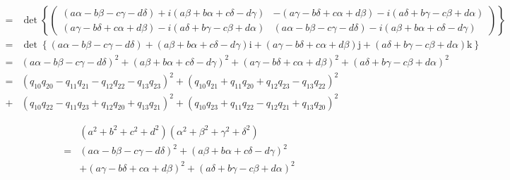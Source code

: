 \documentclass[
]{book}
\theoremstyle{definition}
\theoremstyle{definition}
\theoremstyle{definition}
\theoremstyle{definition}
\theoremstyle{remark}
\begin{document}
\[\begin{aligned}
= & \det\left\{ \begin{pmatrix}\left(a\alpha-b\beta-c\gamma-d\delta\right)+i\left(a\beta+b\alpha+c\delta-d\gamma\right) & -\left(a\gamma-b\delta+c\alpha+d\beta\right)-i\left(a\delta+b\gamma-c\beta+d\alpha\right)\\
\left(a\gamma-b\delta+c\alpha+d\beta\right)-i\left(a\delta+b\gamma-c\beta+d\alpha\right) & \left(a\alpha-b\beta-c\gamma-d\delta\right)-i\left(a\beta+b\alpha+c\delta-d\gamma\right)
\end{pmatrix}\right\} \\
= & \det\left\{ \left(a\alpha-b\beta-c\gamma-d\delta\right)+\left(a\beta+b\alpha+c\delta-d\gamma\right)\mathrm{i}+\left(a\gamma-b\delta+c\alpha+d\beta\right)\mathrm{j}+\left(a\delta+b\gamma-c\beta+d\alpha\right)\mathrm{k}\right\} \\
= & \left(a\alpha-b\beta-c\gamma-d\delta\right)^{2}+\left(a\beta+b\alpha+c\delta-d\gamma\right)^{2}+\left(a\gamma-b\delta+c\alpha+d\beta\right)^{2}+\left(a\delta+b\gamma-c\beta+d\alpha\right)^{2}\\
= & \left(q_{{\scriptscriptstyle 10}}q_{{\scriptscriptstyle 20}}-q_{{\scriptscriptstyle 11}}q_{{\scriptscriptstyle 21}}-q_{{\scriptscriptstyle 12}}q_{{\scriptscriptstyle 22}}-q_{{\scriptscriptstyle 13}}q_{{\scriptscriptstyle 23}}\right)^{2}+\left(q_{{\scriptscriptstyle 10}}q_{{\scriptscriptstyle 21}}+q_{{\scriptscriptstyle 11}}q_{{\scriptscriptstyle 20}}+q_{{\scriptscriptstyle 12}}q_{{\scriptscriptstyle 23}}-q_{{\scriptscriptstyle 13}}q_{{\scriptscriptstyle 22}}\right)^{2}\\
+ & \left(q_{{\scriptscriptstyle 10}}q_{{\scriptscriptstyle 22}}-q_{{\scriptscriptstyle 11}}q_{{\scriptscriptstyle 23}}+q_{{\scriptscriptstyle 12}}q_{{\scriptscriptstyle 20}}+q_{{\scriptscriptstyle 13}}q_{{\scriptscriptstyle 21}}\right)^{2}+\left(q_{{\scriptscriptstyle 10}}q_{{\scriptscriptstyle 23}}+q_{{\scriptscriptstyle 11}}q_{{\scriptscriptstyle 22}}-q_{{\scriptscriptstyle 12}}q_{{\scriptscriptstyle 21}}+q_{{\scriptscriptstyle 13}}q_{{\scriptscriptstyle 20}}\right)^{2}
\end{aligned}
\]

\[
\begin{aligned}
 & \left(a^{2}+b^{2}+c^{2}+d^{2}\right)\left(\alpha^{2}+\beta^{2}+\gamma^{2}+\delta^{2}\right)\\
= & \left(a\alpha-b\beta-c\gamma-d\delta\right)^{2}+\left(a\beta+b\alpha+c\delta-d\gamma\right)^{2}\\
 & +\left(a\gamma-b\delta+c\alpha+d\beta\right)^{2}+\left(a\delta+b\gamma-c\beta+d\alpha\right)^{2}
\end{aligned}
\]
\end{document}

